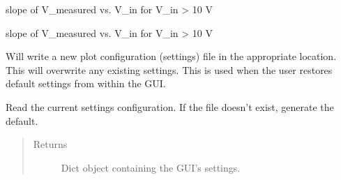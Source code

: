 \documentclass[letterpaper,10pt,english]{sphinxmanual}
\begin{document}
\begin{fulllineitems}
\label{\detokenize{settings_interface:settings_interface.m2}}
slope of V\_measured vs. V\_in for V\_in \textgreater{} 10 V

\end{fulllineitems}


\begin{fulllineitems}
\label{\detokenize{settings_interface:settings_interface.b2}}
slope of V\_measured vs. V\_in for V\_in \textgreater{} 10 V

\end{fulllineitems}


\begin{fulllineitems}
\label{\detokenize{settings_interface:settings_interface.generate_plotting_configuration_file}}
Will write a new plot configuration (settings) file in the appropriate location.
This will overwrite any existing settings.
This is used when the user restores default settings from within the GUI.

\end{fulllineitems}


\begin{fulllineitems}
\label{\detokenize{settings_interface:settings_interface.read_plotting_configuration}}
Read the current settings configuration. If the file doesn’t exist, generate the default.
\begin{quote}\begin{description}
\item[{Returns}] \leavevmode
Dict object containing the GUI’s settings.

\end{description}\end{quote}

\end{fulllineitems}
\end{document}
